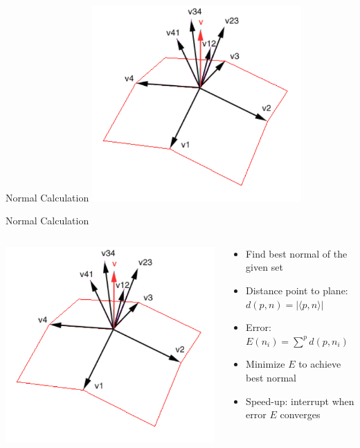 \documentclass{beamer}
\begin{document}
\begin{frame}{Normal Calculation}
	\centering
	\includegraphics[width=0.6\textwidth]{normal_calculation.png}
\end{frame}

\begin{frame}{Normal Calculation}
	\begin{columns}
		\begin{column}{0.4\textwidth}
			\centering
			\includegraphics[width=1.0\textwidth]{normal_calculation.png}
		\end{column}
		\begin{column}{0.6\textwidth}
			\begin{itemize}
				\item Find best normal of the given set
				\item Distance point to plane: $d(p,n) = |\langle p,n \rangle|$
				\item Error: $E(n_i) = \sum\limits^{p}{d(p,n_i)}$
				\item Minimize $E$ to achieve best normal
				\item Speed-up: interrupt when error $E$ converges
			\end{itemize}
		\end{column}
	\end{columns}
\end{frame}
\end{document}
